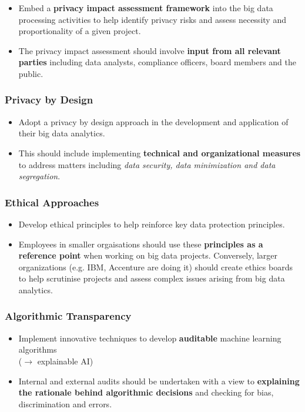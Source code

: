 \documentclass[a4paper]{article}
\begin{document}
			\begin{itemize}
				\item Embed a \textbf{privacy impact assessment framework} into the big data processing activities to help identify privacy risks and assess necessity and proportionality of a given project.
				\item The privacy impact assessment should involve \textbf{input from all relevant parties} including data analysts, compliance officers, board members and the public.
			\end{itemize}
	
			\subsubsection{Privacy by Design}
			
			\begin{itemize}
				\item Adopt a privacy by design approach in the development and application of their big data analytics.
				\item This should include implementing \textbf{technical and organizational measures} to address matters including \textit{data security, data minimization and data segregation}.
			\end{itemize}
		
			\subsubsection{Ethical Approaches}
			
			\begin{itemize}
				\item Develop ethical principles to help reinforce key data protection principles.
				\item Employees in smaller orgaisations should use these \textbf{principles as a reference point} when working on big data projects.
					Conversely, larger organizations (e.g. IBM, Accenture are doing it) should create ethics boards to help scrutinise projects and assess complex issues arising from big data analytics.
			\end{itemize}
		
			\subsubsection{Algorithmic Transparency}
			
			\begin{itemize}
				\item Implement innovative techniques to develop \textbf{auditable} machine learning algorithms \\
					($\rightarrow$ explainable AI)
				\item Internal and external audits should be undertaken with a view to \textbf{explaining the rationale behind algorithmic decisions} and checking for bias, discrimination and errors.
			\end{itemize}
				
\end{document}
